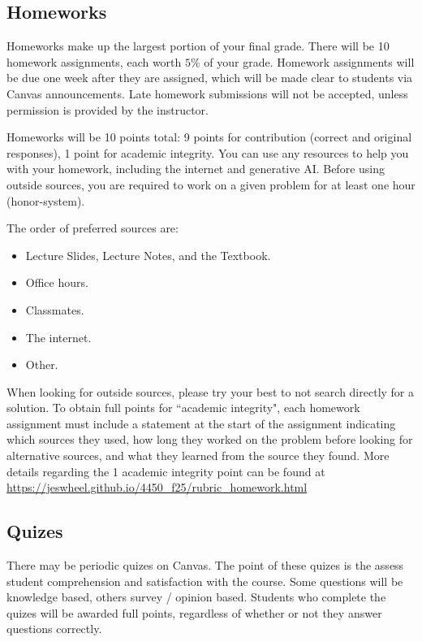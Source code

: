 \documentclass[11pt]{article}\usepackage[]{graphicx}\usepackage[]{xcolor}
\begin{document}
\subsection{Homeworks}

Homeworks make up the largest portion of your final grade.
There will be 10 homework assignments, each worth $5\%$ of your grade.
Homework assignments will be due one week after they are assigned, which will be made clear to students via Canvas announcements.
Late homework submissions will not be accepted, unless permission is provided by the instructor.

Homeworks will be 10 points total: 9 points for contribution (correct and original responses), 1 point for academic integrity.
You can use any resources to help you with your homework, including the internet and generative AI.
Before using outside sources, you are required to work on a given problem for at least one hour (honor-system).

The order of preferred sources are:
\begin{itemize}
  \item Lecture Slides, Lecture Notes, and the Textbook.
  \item Office hours.
  \item Classmates.
  \item The internet.
  \item Other.
\end{itemize}
When looking for outside sources, please try your best to not search directly for a solution.
To obtain full points for ``academic integrity", each homework assignment must include a statement at the start of the assignment indicating which sources they used, how long they worked on the problem before looking for alternative sources, and what they learned from the source they found.
More details regarding the 1 academic integrity point can be found at \url{https://jeswheel.github.io/4450\_f25/rubric\_homework.html} 


\subsection{Quizes}

There may be periodic quizes on Canvas. The point of these quizes is the assess student comprehension and satisfaction with the course.
Some questions will be knowledge based, others survey / opinion based. 
Students who complete the quizes will be awarded full points, regardless of whether or not they answer questions correctly.
\end{document}
